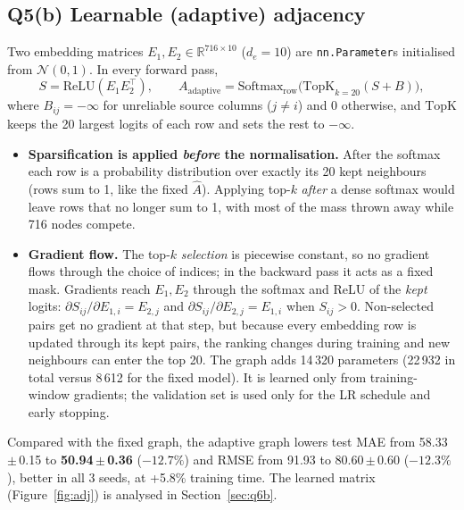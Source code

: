 \documentclass[11pt,a4paper]{article}
\newcommand{\sd}[2]{#1{\scriptsize\,$\scriptstyle\pm$\,#2}}
\begin{document}
\subsection{Q5(b) Learnable (adaptive) adjacency}
Two embedding matrices $E_1,E_2\in\mathbb R^{716\times10}$ ($d_e=10$) are \texttt{nn.Parameter}s initialised from
$\mathcal N(0,1)$. In every forward pass,
\[
  S=\mathrm{ReLU}(E_1E_2^\top),\qquad
  A_{\text{adaptive}}=\mathrm{Softmax}_{\text{row}}\big(\mathrm{TopK}_{k=20}(S+B)\big),
\]
where $B_{ij}=-\infty$ for unreliable source columns ($j\ne i$) and 0 otherwise, and $\mathrm{TopK}$ keeps the 20 largest
logits of each row and sets the rest to $-\infty$.
\begin{itemize}
\item \textbf{Sparsification is applied \emph{before} the normalisation.} After the softmax each row is a probability
distribution over exactly its 20 kept neighbours (rows sum to 1, like the fixed $\hat A$). Applying top-$k$ \emph{after} a
dense softmax would leave rows that no longer sum to 1, with most of the mass thrown away while 716 nodes compete.
\item \textbf{Gradient flow.} The top-$k$ \emph{selection} is piecewise constant, so no gradient flows through the choice of
indices; in the backward pass it acts as a fixed mask. Gradients reach $E_1,E_2$ through the softmax and ReLU of the
\emph{kept} logits: $\partial S_{ij}/\partial E_{1,i}=E_{2,j}$ and $\partial S_{ij}/\partial E_{2,j}=E_{1,i}$ when
$S_{ij}>0$. Non-selected pairs get no gradient at that step, but because every embedding row is updated through its kept
pairs, the ranking changes during training and new neighbours can enter the top 20. The graph adds 14\,320 parameters
(22\,932 in total versus 8\,612 for the fixed model). It is learned only from training-window gradients; the validation set
is used only for the LR schedule and early stopping.
\end{itemize}
Compared with the fixed graph, the adaptive graph lowers test MAE from \sd{58.33}{0.15} to \textbf{\sd{50.94}{0.36}}
($-12.7\%$) and RMSE from 91.93 to \sd{80.60}{0.60} ($-12.3\%$), better in all 3 seeds, at +5.8\% training time. The learned
matrix (Figure~\ref{fig:adj}) is analysed in Section~\ref{sec:q6b}.
\end{document}
